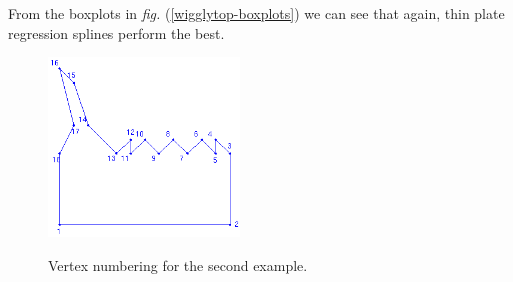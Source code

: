\documentclass[a4paper,10pt]{amsart}
\newcommand{\fig}[1]{\emph{fig.} (\ref{#1})}
\begin{document}
From the boxplots in \fig{wigglytop-boxplots} we can see that again, thin plate regression splines perform the best.

\begin{figure}
\centering
\includegraphics[width=2in]{figs-otherdomains/wigglytop-numbered.png} \\
\caption{Vertex numbering for the second example.}
\label{wigglytop-numbered}
\end{figure}
\end{document}
